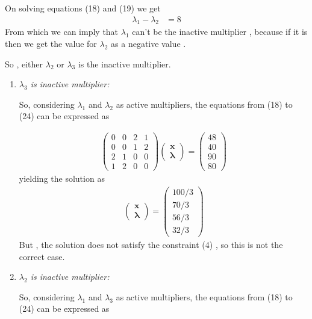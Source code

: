 \documentclass[journal,12pt,twocolumn]{IEEEtran}
\newcommand{\myvec}[1]{\ensuremath{\begin{pmatrix}#1\end{pmatrix}}}
\let\vec\mathbf
\begin{document}
\begin{enumerate}
        On solving equations (18) and (19) we get 
        \begin{align}
        	\lambda_1 - \lambda_2  &= 8 
        \end{align}
        From which we can imply that $\lambda_1$ can't be the inactive multiplier , because if it is then we get the value for $\lambda_2$ as a negative value .

        So , either $\lambda_2$ or $\lambda_3$ is the inactive multiplier.
        \begin{enumerate}
        \item {\em $\lambda_3$ is inactive multiplier:}
    
        So, considering $\lambda_1$ and $\lambda_2$ as active multipliers, the equations from (18) to (24) can be expressed as

        \begin{align}
            \myvec{0 & 0 & 2 & 1 \\
        		   0 & 0 & 1 & 2 \\
        		   2 & 1 & 0 & 0 \\
        		   1 & 2 & 0 & 0 }
        	\myvec{\vec{x} \\ \bm{\lambda}} = \myvec{48\\40\\90\\80}
        \end{align}
        yielding the solution as
        \begin{align}
	        \myvec{\vec{x} \\ \bm{\lambda}} = \myvec{100/3\\70/3\\56/3\\32/3}
        \end{align}
        But , the solution does not satisfy the constraint (4) , so this is not the correct case.
        \item {\em $\lambda_2$ is inactive multiplier:}
    
        So, considering $\lambda_1$ and $\lambda_3$ as active multipliers, the equations from (18) to (24) can be expressed as


\end{enumerate}
\end{enumerate}
\end{document}
